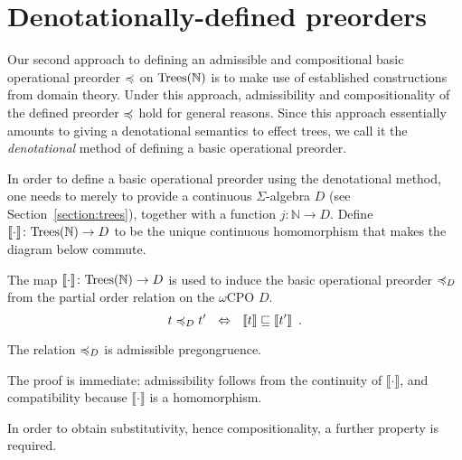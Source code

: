 \section{Denotationally-defined preorders}
\label{section:denotational}

Our second approach to defining an admissible and compositional basic operational
preorder $\preccurlyeq$ on $\textnormal{Trees}(\mathbb{N})$ is to make use of established constructions from domain theory.
Under this approach, admissibility and compositionality of the defined preorder $\preccurlyeq$ hold
for general reasons. Since this approach essentially amounts to giving a denotational semantics to effect trees, we call it the \emph{denotational} method of defining a basic operational preorder.



In order to define a basic operational preorder using the denotational method, one needs to merely to provide
a continuous $\Sigma$-algebra $D$ (see Section~\ref{section:trees}),  together with a function
$j\colon \mathbb{N} \to D$. 
Define   $\llbracket \cdot \rrbracket \colon \textnormal{Trees}(\mathbb{N}) \to D$ to be the unique continuous homomorphism that makes the diagram below commute.
   \begin{center}
    \end{center}
\noindent
The map $\llbracket \cdot \rrbracket \colon \textnormal{Trees}(\mathbb{N}) \to D$ is used to induce
the basic operational preorder $\preccurlyeq_D$ from the partial order relation on the $\omega$CPO $D$.
\[
t \preccurlyeq_D t' ~~ \Leftrightarrow ~~ \llbracket t \rrbracket \sqsubseteq \llbracket t'  \rrbracket \enspace .
\]
\begin{proposition}
The relation $\preccurlyeq_D$ is admissible pregongruence.
\end{proposition}
%
The proof is immediate: admissibility follows from the continuity of 
$\llbracket \cdot \rrbracket$, and compatibility because  $\llbracket \cdot \rrbracket$ is a homomorphism.

In order to obtain substitutivity, hence compositionality, a further property is required.

